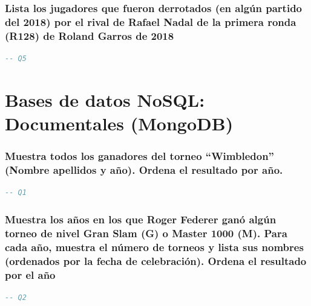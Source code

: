 \documentclass[11pt]{opticajnl}
\begin{document}
\subsubsection{Lista los jugadores que fueron derrotados (en algún partido del 2018) por el rival de Rafael Nadal de la primera ronda (R128) de Roland Garros de 2018}

\begin{lstlisting}[language=SQL]
-- Q5
\end{lstlisting}


































\section{Bases de datos NoSQL: Documentales (MongoDB)}

\subsubsection{Muestra todos los ganadores del torneo ``Wimbledon'' (Nombre apellidos y año). Ordena el resultado por año.}

\begin{lstlisting}[language=SQL]
-- Q1
\end{lstlisting}





\subsubsection{Muestra los años en los que Roger Federer ganó algún torneo de nivel Gran Slam (G) o Master 1000 (M). Para cada año, muestra el número de torneos y lista sus nombres (ordenados por la fecha de celebración). Ordena el resultado por el año}

\begin{lstlisting}[language=SQL]
-- Q2
\end{lstlisting}
\end{document}
